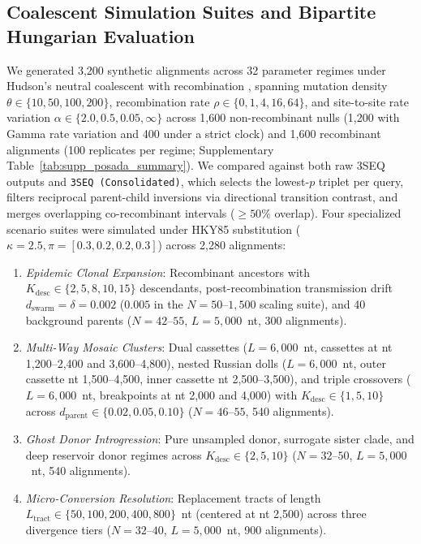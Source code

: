 \subsection{Coalescent Simulation Suites and Bipartite Hungarian Evaluation}
\label{subsec:methods_benchmarks}
We generated 3,200 synthetic alignments across 32 parameter regimes under Hudson's neutral coalescent with recombination \citep{hudson1983properties,posada2001evaluation}, spanning mutation density $\theta \in \{10, 50, 100, 200\}$, recombination rate $\rho \in \{0, 1, 4, 16, 64\}$, and site-to-site rate variation $\alpha \in \{2.0, 0.5, 0.05, \infty\}$ across 1,600 non-recombinant nulls (1,200 with Gamma rate variation and 400 under a strict clock) and 1,600 recombinant alignments (100 replicates per regime; Supplementary Table~\ref{tab:supp_posada_summary}). We compared \RhizAeon against both raw 3SEQ outputs and \texttt{3SEQ (Consolidated)}, which selects the lowest-$p$ triplet per query, filters reciprocal parent-child inversions via directional transition contrast, and merges overlapping co-recombinant intervals ($\ge 50\%$ overlap). Four specialized scenario suites were simulated under HKY85 substitution ($\kappa = 2.5, \pi = [0.3, 0.2, 0.2, 0.3]$) across 2,280 alignments:
\begin{enumerate}
\item \emph{Epidemic Clonal Expansion}: Recombinant ancestors with $K_{\mathrm{desc}} \in \{2, 5, 8, 10, 15\}$ descendants, post-recombination transmission drift $d_{\mathrm{swarm}} = \delta = 0.002$ ($0.005$ in the $N = 50\text{--}1{,}500$ scaling suite), and 40 background parents ($N = 42\text{--}55$, $L = 5{,}000$~nt, 300 alignments).
\item \emph{Multi-Way Mosaic Clusters}: Dual cassettes ($L = 6{,}000$~nt, cassettes at nt 1,200--2,400 and 3,600--4,800), nested Russian dolls ($L = 6{,}000$~nt, outer cassette nt 1,500--4,500, inner cassette nt 2,500--3,500), and triple crossovers ($L = 6{,}000$~nt, breakpoints at nt 2,000 and 4,000) with $K_{\mathrm{desc}} \in \{1, 5, 10\}$ across $d_{\mathrm{parent}} \in \{0.02, 0.05, 0.10\}$ ($N = 46\text{--}55$, 540 alignments).
\item \emph{Ghost Donor Introgression}: Pure unsampled donor, surrogate sister clade, and deep reservoir donor regimes across $K_{\mathrm{desc}} \in \{2, 5, 10\}$ ($N = 32\text{--}50$, $L = 5{,}000$~nt, 540 alignments).
\item \emph{Micro-Conversion Resolution}: Replacement tracts of length $L_{\text{tract}} \in \{50, 100, 200, 400, 800\}$~nt (centered at nt 2,500) across three divergence tiers ($N = 32\text{--}40$, $L = 5{,}000$~nt, 900 alignments).
\end{enumerate}
